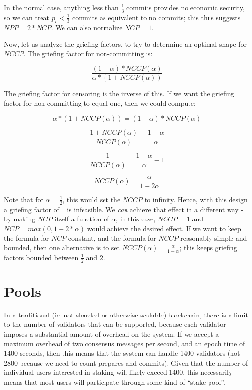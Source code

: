 \documentclass[12pt]{article}
\begin{document}
In the normal case, anything less than $\frac{1}{3}$ commits provides no economic security, so we can treat $p_c < \frac{1}{3}$ commits as equivalent to no commits; this thus suggests $NPP = 2 * NCP$. We can also normalize $NCP = 1$.

Now, let us analyze the griefing factors, to try to determine an optimal shape for $NCCP$. The griefing factor for non-committing is:

$$\frac{(1-\alpha) * NCCP(\alpha)}{\alpha * (1 + NCCP(\alpha))}$$

The griefing factor for censoring is the inverse of this. If we want the griefing factor for non-committing to equal one, then we could compute:

$$\alpha * (1 + NCCP(\alpha)) = (1-\alpha) * NCCP(\alpha)$$

$$\frac{1 + NCCP(\alpha)}{NCCP(\alpha)} = \frac{1-\alpha}{\alpha}$$

$$\frac{1}{NCCP(\alpha)} = \frac{1-\alpha}{\alpha} - 1$$

$$NCCP(\alpha) = \frac{\alpha}{1-2\alpha}$$

Note that for $\alpha = \frac{1}{2}$, this would set the $NCCP$ to infinity. Hence, with this design a griefing factor of $1$ is infeasible. We \textit{can} achieve that effect in a different way - by making $NCP$ itself a function of $\alpha$; in this case, $NCCP = 1$ and $NCP = max(0, 1 - 2 * \alpha)$ would achieve the desired effect. If we want to keep the formula for $NCP$ constant, and the formula for $NCCP$ reasonably simple and bounded, then one alternative is to set $NCCP(\alpha) = \frac{\alpha}{1-\alpha}$; this keeps griefing factors bounded between $\frac{1}{2}$ and $2$.

\section{Pools}

In a traditional (ie. not sharded or otherwise scalable) blockchain, there is a limit to the number of validators that can be supported, because each validator imposes a substantial amount of overhead on the system. If we accept a maximum overhead of two consensus messages per second, and an epoch time of 1400 seconds, then this means that the system can handle 1400 validators (not 2800 because we need to count prepares and commits). Given that the number of individual users interested in staking will likely exceed 1400, this necessarily means that most users will participate through some kind of ``stake pool''.
\end{document}
